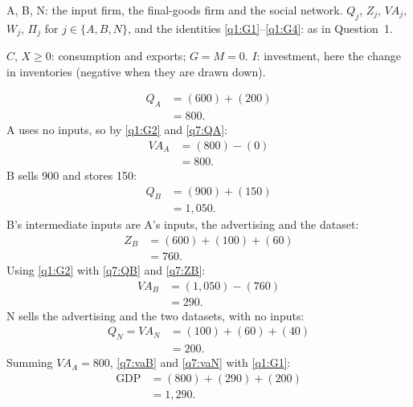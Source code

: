 \begin{sol}
\begin{notacao}
\item A, B, N: the input firm, the final-goods firm and the social network. $Q_j$, $Z_j$, $VA_j$, $W_j$, $\Pi_j$ for
$j\in\{A,B,N\}$, and the identities \eqref{q1:G1}--\eqref{q1:G4}: as in Question~1.
\item $C$, $X\ge0$: consumption and exports; $G=M=0$. $I$: investment, here the change in inventories (negative when they are
drawn down).
\end{notacao}

\begin{align}
Q_A &= (600)+(200) \nonumber\\
&= 800. \label{q7:QA}
\end{align}
A uses no inputs, so by \eqref{q1:G2} and \eqref{q7:QA}:
\begin{align*}
VA_A &= (800)-(0)\\
&= 800 .
\end{align*}
B sells 900 and stores 150:
\begin{align}
Q_B &= (900)+(150) \nonumber\\
&= 1{,}050. \label{q7:QB}
\end{align}
B's intermediate inputs are A's inputs, the advertising and the dataset:
\begin{align}
Z_B &= (600)+(100)+(60) \nonumber\\
&= 760. \label{q7:ZB}
\end{align}
Using \eqref{q1:G2} with \eqref{q7:QB} and \eqref{q7:ZB}:
\begin{align}
VA_B &= (1{,}050)-(760) \nonumber\\
&= 290. \label{q7:vaB}
\end{align}
N sells the advertising and the two datasets, with no inputs:
\begin{align}
Q_N=VA_N &= (100)+(60)+(40) \nonumber\\
&= 200. \label{q7:vaN}
\end{align}
Summing $VA_A=800$, \eqref{q7:vaB} and \eqref{q7:vaN} with \eqref{q1:G1}:
\begin{align*}
\text{GDP} &= (800)+(290)+(200)\\
&= 1{,}290 .
\end{align*}
\begin{align}

\end{align}
\end{sol}
